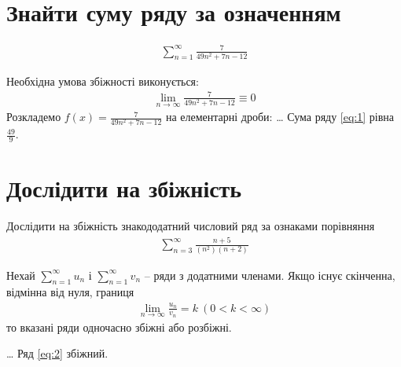 \documentclass[../../../../document]{subfiles}
\begin{document}
	\nocite{*}
	\chapter{Знайти суму ряду за означенням}
	\begin{gather}
		\sum_{n=1}^\infty\frac{7}{49n^2+7n-12} \label{eq:1}
	\end{gather}

	\solving
	Необхідна умова збіжності виконується:
	\begin{gather}
		\lim_{n\to\infty} \frac{7}{49n^2+7n-12} \equiv 0
	\end{gather}
	Розкладемо \(f(x) = \frac{7}{49n^2+7n-12}\) на елементарні дроби:
	\ldots
	\ansver
	Сума ряду \ref{eq:1} рівна \(\frac{49}{9}\).

	\chapter{Дослідити на збіжність}
	Дослідити на збіжність знакододатний числовий ряд за ознаками порівняння
	\begin{gather}
		\sum_{n=3}^\infty \frac{n+5}{(n^2)(n+2)} \label{eq:2}
	\end{gather}

	\begin{thm}
		\label{dfn:zbiz}
		Нехай \(\sum_{n=1}^\infty u_n\) і \(\sum_{n=1}^\infty v_n\) -- ряди з додатними членами. Якщо існує скінченна, відмінна від нуля, границя
		\begin{gather}
			\lim_{n\to\infty}\frac{u_n}{v_n}=k\ (0<k<\infty)
		\end{gather}
		то вказані ряди одночасно збіжні або розбіжні.
	\end{thm}
	\solving
	\ldots
	\ansver
	Ряд \ref{eq:2} збіжний.
\end{document}
